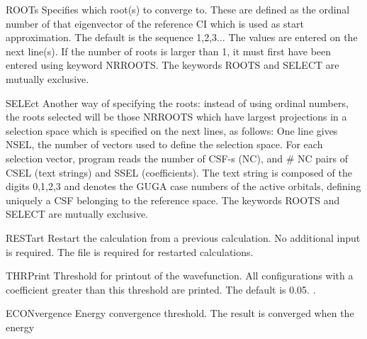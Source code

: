 \begin{keywordlist}
\item[ROOTs]
Specifies which root(s) to converge to. These are defined as the
ordinal number of that eigenvector of the reference CI which is
used as start approximation. The default is the sequence 1,2,3$\ldots$
The values are entered on the next line(s). If the number of roots is
larger than 1, it must first have been entered using keyword NRROOTS.
The keywords ROOTS and SELECT are mutually exclusive.
\item[SELEct]
Another way of specifying the roots: instead of using ordinal
numbers, the roots selected will be those NRROOTS which have
largest projections in a selection space
which is specified on the next lines, as follows:
One line gives NSEL, the number of vectors used to define the
selection space. For each selection vector, program reads
the number of CSF-{}s (NC), and \# NC pairs of CSEL (text strings) and SSEL (coefficients).
The text string is composed of the
digits 0,1,2,3 and denotes the GUGA case numbers of the active
orbitals, defining uniquely a CSF belonging to the reference space.
The keywords ROOTS and SELECT are mutually exclusive.
\item[RESTart]
Restart the calculation from a previous calculation. No additional
input is required. The  file is required for restarted
calculations.
\item[THRPrint]
Threshold for printout of the wavefunction. All configurations with a
coefficient greater than this threshold are printed.
The default is 0.05. .
\item[ECONvergence]
Energy convergence threshold. The result is converged when the energy

\end{keywordlist}
